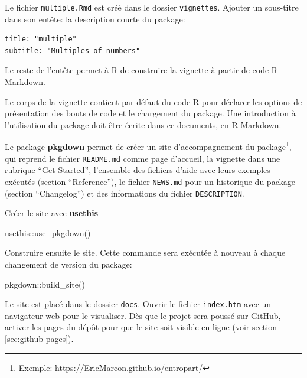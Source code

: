 \documentclass[
  11pt,
  french,
  a4paper,
  extrafontsizes,onecolumn,openright
  ]{memoir}
\newenvironment{Shaded}{\begin{snugshade}}{\end{snugshade}}
\newcommand{\FunctionTok}[1]{\textcolor[rgb]{0.00,0.00,0.00}{#1}}
\newcommand{\NormalTok}[1]{#1}
\newcommand{\SpecialCharTok}[1]{\textcolor[rgb]{0.00,0.00,0.00}{#1}}
\begin{document}
\normalsize

Le fichier \texttt{multiple.Rmd} est créé dans le dossier \texttt{vignettes}.
Ajouter un sous-titre dans son entête: la description courte du package:

\begin{verbatim}
title: "multiple"
subtitle: "Multiples of numbers"
\end{verbatim}

Le reste de l'entête permet à R de construire la vignette à partir de code R Markdown.

Le corps de la vignette contient par défaut du code R pour déclarer les options de présentation des bouts de code et le chargement du package.
Une introduction à l'utilisation du package doit être écrite dans ce documents, en R Markdown.

Le package \textbf{pkgdown} permet de créer un site d'accompagnement du package\footnote{Exemple: \url{https://EricMarcon.github.io/entropart/}}, qui reprend le fichier \texttt{README.md} comme page d'accueil, la vignette dans une rubrique ``Get Started'', l'ensemble des fichiers d'aide avec leurs exemples exécutés (section ``Reference''), le fichier \texttt{NEWS.md} pour un historique du package (section ``Changelog'') et des informations du fichier \texttt{DESCRIPTION}.

Créer le site avec \textbf{usethis}

\scriptsize

\begin{Shaded}
\begin{Highlighting}[]
\NormalTok{usethis}\SpecialCharTok{::}\FunctionTok{use\_pkgdown}\NormalTok{()}
\end{Highlighting}
\end{Shaded}

\normalsize

Construire ensuite le site.
Cette commande sera exécutée à nouveau à chaque changement de version du package:

\scriptsize

\begin{Shaded}
\begin{Highlighting}[]
\NormalTok{pkgdown}\SpecialCharTok{::}\FunctionTok{build\_site}\NormalTok{()}
\end{Highlighting}
\end{Shaded}

\normalsize

Le site est placé dans le dossier \texttt{docs}.
Ouvrir le fichier \texttt{index.htm} avec un navigateur web pour le visualiser.
Dès que le projet sera poussé sur GitHub, activer les pages du dépôt pour que le site soit visible en ligne (voir section \ref{sec:github-pages}).
\end{document}
